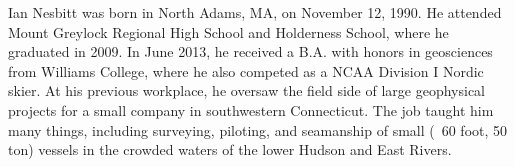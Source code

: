 \begin{biography}			%
Ian Nesbitt was born in North Adams, MA, on November 12, 1990. He attended Mount Greylock Regional High School and Holderness School, where he graduated in 2009. In June 2013, he received a B.A. with honors in geosciences from Williams College, where he also competed as a NCAA Division I Nordic skier. At his previous workplace, he oversaw the field side of large geophysical projects for a small company in southwestern Connecticut. The job taught him many things, including  surveying, piloting, and seamanship of small (~60 foot, 50 ton) vessels in the crowded waters of the lower Hudson and East Rivers.
\end{biography}

\endinput